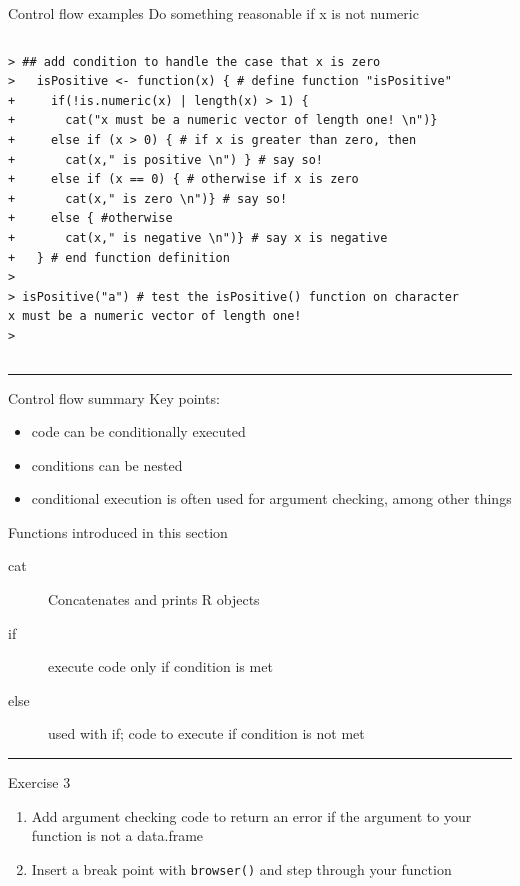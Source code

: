 \documentclass[table,smaller]{beamer}
\begin{document}
\begin{frame}[fragile,label=sec-6-4]{Control flow examples}
 Do something reasonable if x is not numeric

\vspace{-.5em}
\begin{columns}
\begin{block}{}
\begin{verbatim}
> ## add condition to handle the case that x is zero
>   isPositive <- function(x) { # define function "isPositive"
+     if(!is.numeric(x) | length(x) > 1) {
+       cat("x must be a numeric vector of length one! \n")}
+     else if (x > 0) { # if x is greater than zero, then
+       cat(x," is positive \n") } # say so! 
+     else if (x == 0) { # otherwise if x is zero
+       cat(x," is zero \n")} # say so!
+     else { #otherwise
+       cat(x," is negative \n")} # say x is negative
+   } # end function definition
> 
> isPositive("a") # test the isPositive() function on character
x must be a numeric vector of length one! 
>
\end{verbatim}
\end{block}
\end{columns}
\vspace{.5em}

\rule{\linewidth}{0.5pt}
\end{frame}
\begin{frame}[label=sec-6-5]{Control flow summary}
Key points:
\begin{itemize}
\item code can be conditionally executed
\item conditions can be nested
\item conditional execution is often used for argument checking, among other things
\end{itemize}

Functions introduced in this section  
\begin{description}
\item[{cat}] Concatenates and prints R objects
\item[{if}] execute code only if condition is met
\item[{else}] used with \alert{if}; code to execute if condition is not met
\end{description}

\rule{\linewidth}{0.5pt}
\end{frame}
\begin{frame}[fragile,label=sec-6-6]{Exercise 3}
 \begin{enumerate}
\item Add argument checking code to return an error if the argument to your function is not a data.frame

\item Insert a break point with \texttt{browser()} and step through your function
\end{enumerate}
\end{frame}
\end{document}
